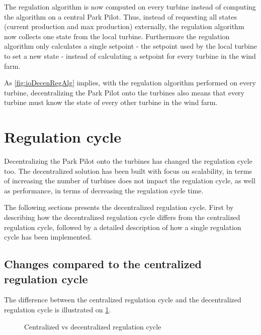 The regulation algorithm is now computed on every turbine instead of computing the algorithm on a central Park Pilot. Thus, instead of requesting all states (current production and max production) externally, the regulation algorithm now collects one state from the local turbine. Furthermore the regulation algorithm only calculates a single setpoint - the setpoint used by the local turbine to set a new state - instead of calculating a setpoint for every turbine in the wind farm.

As \cref{fig:ioDecenRegAlg} implies, with the regulation algorithm performed on every turbine, decentralizing the Park Pilot onto the turbines also means that every turbine must know the state of every other turbine in the wind farm.

\section{Regulation cycle}

Decentralizing the Park Pilot onto the turbines has changed the regulation cycle too. The decentralized solution has been built with focus on scalability, in terms of increasing the number of turbines does not impact the regulation cycle, as well as performance, in terms of decreasing the regulation cycle time.

The following sections presents the decentralized regulation cycle. First by describing how the decentralized regulation cycle differs from the centralized regulation cycle, followed by a detailed description of how a single regulation cycle has been implemented. 


\subsection{Changes compared to the centralized regulation cycle}\label{sec:regCycleChanges}

The difference between the centralized regulation cycle and the decentralized regulation cycle is illustrated on \cref{fig:cycleCentralVSDecentral}. 

\begin{figure}[!h]

	{}
	\newline
	
	\newline
	
	{}
	\newline
	
	\caption{Centralized vs decentralized regulation cycle}
	\label{fig:cycleCentralVSDecentral}
\end{figure}

